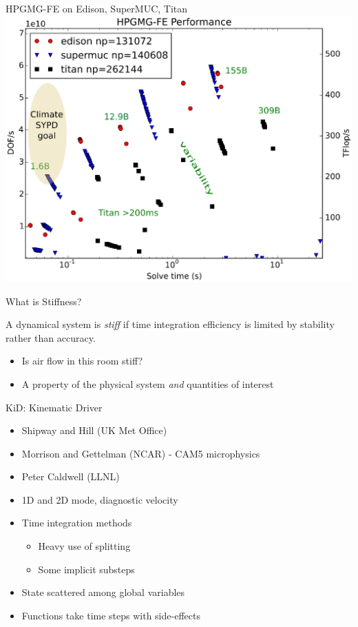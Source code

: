 \documentclass{beamer}
\begin{document}
\begin{frame}{HPGMG-FE on Edison, SuperMUC, Titan}
  \includegraphics[width=\textwidth]{figures/hpgmg/range-edison-supermuc-titan-ann2.eps}
\end{frame}

\begin{frame}{What is Stiffness?}
  \begin{definition}[Stiffness]
    A dynamical system is \emph{stiff} if time integration efficiency is limited by stability rather than accuracy.
  \end{definition}
  \begin{itemize}
  \item Is air flow in this room stiff?
  \item<2> A property of the physical system \emph{and} quantities of interest
  \end{itemize}
\end{frame}

\begin{frame}{KiD: Kinematic Driver}
  \begin{itemize}
  \item Shipway and Hill (UK Met Office)
  \item Morrison and Gettelman (NCAR) - CAM5 microphysics
  \item Peter Caldwell (LLNL)
  \item 1D and 2D mode, diagnostic velocity
  \item Time integration methods
    \begin{itemize}
    \item Heavy use of splitting
    \item Some implicit substeps
    \end{itemize}
  \item State scattered among global variables
  \item Functions take time steps with side-effects
  \end{itemize}
\end{frame}
\end{document}
